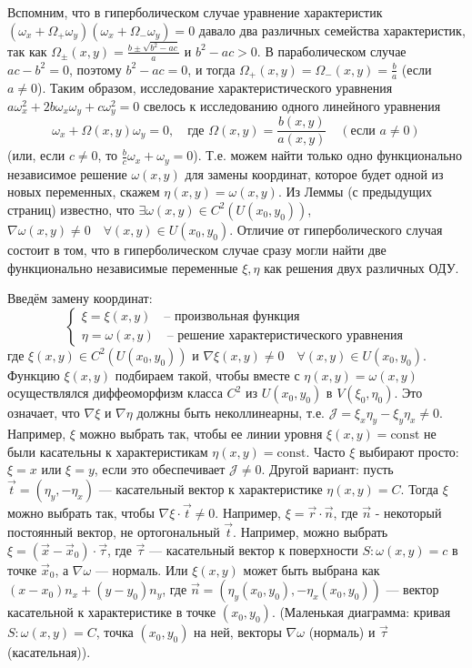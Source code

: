 \documentclass[12pt, a4paper]{article}
\begin{document}
Вспомним, что в гиперболическом случае уравнение характеристик $(\omega_x + \Omega_+\omega_y)(\omega_x + \Omega_-\omega_y)=0$ давало два различных семейства характеристик, так как $\Omega_{\pm}(x,y) = \frac{b \pm \sqrt{b^2-ac}}{a}$ и $b^2-ac > 0$.
В параболическом случае $ac-b^2=0$, поэтому $b^2-ac=0$, и тогда $\Omega_+(x,y) = \Omega_-(x,y) = \frac{b}{a}$ (если $a \neq 0$).
Таким образом, исследование характеристического уравнения $a\omega_x^2 + 2b\omega_x\omega_y + c\omega_y^2 = 0$ свелось к исследованию одного линейного уравнения
\[ \omega_x + \Omega(x,y)\omega_y = 0, \quad \text{где } \Omega(x,y) = \frac{b(x,y)}{a(x,y)} \quad (\text{если } a \neq 0) \]
(или, если $c \neq 0$, то $\frac{b}{c}\omega_x + \omega_y = 0$).
Т.е. можем найти только одно функционально независимое решение $\omega(x,y)$ для замены координат, которое будет одной из новых переменных, скажем $\eta(x,y) = \omega(x,y)$.
Из Леммы (с предыдущих страниц) известно, что $\exists \omega(x,y) \in C^2(U(x_0,y_0))$, $\nabla\omega(x,y) \neq 0 \quad \forall (x,y) \in U(x_0,y_0)$.
Отличие от гиперболического случая состоит в том, что в гиперболическом случае сразу могли найти две функционально независимые переменные $\xi, \eta$ как решения двух различных ОДУ.

Введём замену координат:
\[
\begin{cases}
\xi = \xi(x,y) \quad \text{-- произвольная функция} \\
\eta = \omega(x,y) \quad \text{-- решение характеристического уравнения}
\end{cases}
\]
где $\xi(x,y) \in C^2(U(x_0,y_0))$ и $\nabla\xi(x,y) \neq 0 \quad \forall (x,y) \in U(x_0,y_0)$.
Функцию $\xi(x,y)$ подбираем такой, чтобы вместе с $\eta(x,y)=\omega(x,y)$ осуществлялся диффеоморфизм класса $C^2$ из $U(x_0,y_0)$ в $V(\xi_0,\eta_0)$. Это означает, что $\nabla\xi$ и $\nabla\eta$ должны быть неколлинеарны, т.е. $\mathcal{J} = \xi_x\eta_y - \xi_y\eta_x \neq 0$.
Например, $\xi$ можно выбрать так, чтобы ее линии уровня $\xi(x,y)=\text{const}$ не были касательны к характеристикам $\eta(x,y)=\text{const}$.
Часто $\xi$ выбирают просто: $\xi=x$ или $\xi=y$, если это обеспечивает $\mathcal{J} \neq 0$.
Другой вариант: пусть $\vec{t} = (\eta_y, -\eta_x)$ --- касательный вектор к характеристике $\eta(x,y)=C$. Тогда $\xi$ можно выбрать так, чтобы $\nabla\xi \cdot \vec{t} \neq 0$. Например, $\xi = \vec{r} \cdot \vec{n}$, где $\vec{n}$ - некоторый постоянный вектор, не ортогональный $\vec{t}$.
Например, можно выбрать $\xi = (\vec{x}-\vec{x}_0) \cdot \vec{\tau}$, где $\vec{\tau}$ --- касательный вектор к поверхности $S: \omega(x,y)=c$ в точке $\vec{x}_0$, а $\nabla \omega$ --- нормаль.
Или $\xi(x,y)$ может быть выбрана как $(x-x_0) n_x + (y-y_0) n_y$, где $\vec{n}=(\eta_y(x_0,y_0), -\eta_x(x_0,y_0))$ --- вектор касательной к характеристике в точке $(x_0,y_0)$.
(Маленькая диаграмма: кривая $S: \omega(x,y)=C$, точка $(x_0,y_0)$ на ней, векторы $\nabla\omega$ (нормаль) и $\vec{\tau}$ (касательная)).
\end{document}
